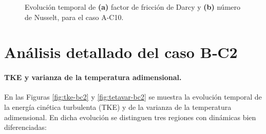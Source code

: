 \begin{figure}[H]
  \centering  
  \caption{Evolución temporal de \textbf{(a)} factor de fricción de Darcy y \textbf{(b)} número de Nusselt, para el caso A-C10.}
  \label{fig:ac10-1}
\end{figure}



\newpage
\section{Análisis detallado del caso B‑C2} \label{sec:bc2}

\paragraph{TKE y varianza de la temperatura adimensional.}
En las Figuras \ref{fig:tke-bc2} y \ref{fig:tetavar-bc2} se muestra la evolución temporal de la energía cinética turbulenta (TKE) y de la varianza de la temperatura adimensional. En dicha evolución se distinguen tres regiones con dinámicas bien diferenciadas:

